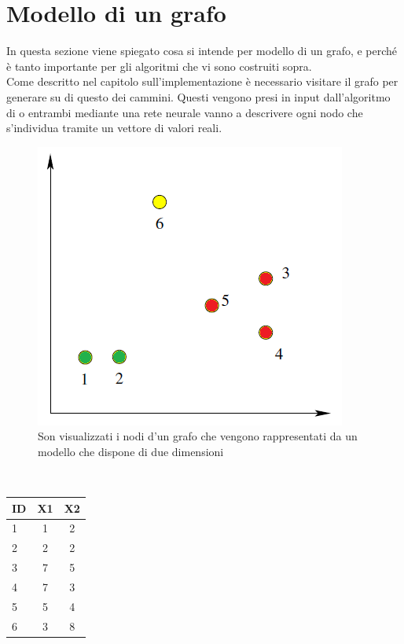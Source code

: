 \section{Modello di un grafo}
In questa sezione viene spiegato cosa si intende per modello di un grafo, e perché è tanto importante per gli algoritmi che vi sono costruiti sopra.\\
Come descritto nel capitolo sull'implementazione è necessario visitare il grafo per generare su di questo dei cammini. Questi vengono presi in input dall'algoritmo di \wv o \cnrl entrambi mediante una rete neurale vanno a descrivere ogni nodo che s'individua tramite un vettore di valori reali.\\
\begin{figure}[htp]
	\centering
	\includegraphics{immagini/punti_modello}
	\caption{Son visualizzati i nodi d'un grafo che vengono rappresentati da un modello che dispone di due dimensioni}
	\label{fig:grafico_modello}
\end{figure}
\\
\begin{center}
	\begin{tabular}{|l|cc|}
		\hline
		ID&X1&X2\\
		\hline
		1 & 1 & 2\\
		2 & 2 & 2\\
		3 & 7 & 5\\
		4 & 7 & 3\\
		5 & 5 & 4\\
		6 & 3 & 8\\
		\hline
	\end{tabular}
	\label{tab:coordinate_modello}
\end{center}
